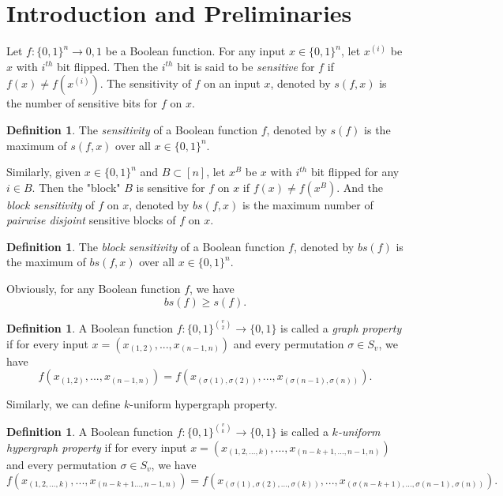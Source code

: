 \documentclass[psamsfonts]{amsart}
\theoremstyle{definition}
\newtheorem{defn}[theorem]{Definition}
\theoremstyle{remark}
\numberwithin{equation}{section}
\begin{document}
	\tableofcontents
	
	\section{Introduction and Preliminaries}
		Let $f: \{0,1\}^n \to {0,1}$ be a Boolean function. For any input $x \in \{0,1 \}^n$, let $x^{(i)}$ be $x$ with $i^{th}$ bit flipped. Then the $i ^ {th}$ bit is said to be \textit{sensitive} for $f$ if $f(x) \neq f(x^{(i)})$. The sensitivity of $f$ on an input $x$, denoted by $s(f,x)$ is the number of sensitive bits for $f$ on $x$.
		\begin{defn}
			The \textit{sensitivity} of a Boolean function $f$, denoted by $s(f)$ is the maximum of $s(f,x)$ over all $x \in \{0,1\}^n$.
		\end{defn}
		Similarly, given $x \in \{0,1\}^n$ and $B \subset [n]$, let $x^{B}$ be $x$ with $i^{th}$ bit flipped for any $i \in B$. Then the "block" $B$ is sensitive for $f$ on $x$ if $f(x) \neq f(x^B)$. And the \textit{block sensitivity} of $f$ on $x$, denoted by $bs(f,x)$ is the maximum number of \textit{pairwise disjoint} sensitive blocks of $f$ on $x$.
		\begin{defn}
			The \textit{block sensitivity} of a Boolean function $f$, denoted by $bs(f)$ is the maximum of $bs(f,x)$ over all $x \in \{0,1\}^n$.
		\end{defn}
		Obviously, for any Boolean function $f$, we have 
		\begin{equation}
			bs(f) \geq s(f). \nonumber
		\end{equation}
		
		\begin{defn}
			A Boolean function $f: \{0,1\}^{v \choose{2}} \to \{0,1\}$ is called a \textit{graph property} if for every input $x = (x_{(1,2)},...,x_{(n-1,n)})$ and every permutation $\sigma \in S_v$, we have
			\begin{equation}
				f(x_{(1,2)},...,x_{(n-1,n)}) = f(x_{(\sigma (1), \sigma (2))},...,x_{(\sigma (n-1), \sigma (n))}). \nonumber
			\end{equation}
		\end{defn}
		Similarly, we can define $k$-uniform hypergraph property.
			\begin{defn}
				A Boolean function $f: \{0,1\}^{v \choose{k}} \to \{0,1\}$ is called a \textit{$k$-uniform hypergraph property} if for every input $x = (x_{(1,2,...,k)},...,x_{(n-k+1,...,n-1,n)})$ and every permutation $\sigma \in S_v$, we have
			\begin{equation}
				f(x_{(1,2,...,k)},...,x_{(n-k+1...,n-1,n)}) = f(x_{(\sigma (1), \sigma (2),..., \sigma(k))},...,x_{(\sigma (n-k+1),...,\sigma (n-1), \sigma (n))}). \nonumber
			\end{equation}
			\end{defn}
			
\end{document}
